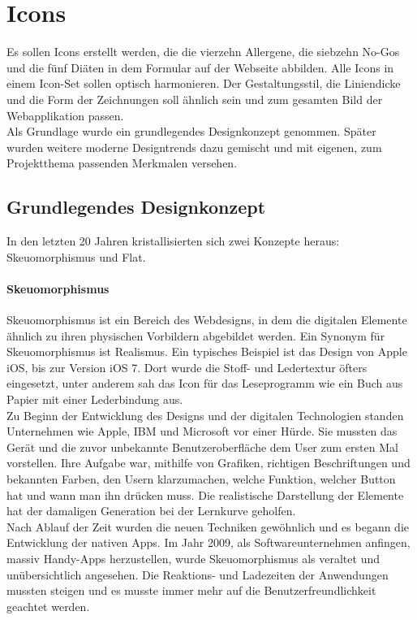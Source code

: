 \section{Icons}

Es sollen Icons erstellt werden, die die vierzehn Allergene, die siebzehn No-Gos und die fünf Diäten in dem Formular auf der Webseite abbilden. Alle Icons in einem Icon-Set sollen optisch harmonieren. Der Gestaltungsstil, die Liniendicke und die Form der Zeichnungen soll ähnlich sein und zum gesamten Bild der Webapplikation passen. \\

Als Grundlage wurde ein grundlegendes Designkonzept genommen. Später wurden weitere moderne Designtrends dazu gemischt und mit eigenen, zum Projektthema passenden Merkmalen versehen. 


\subsection{Grundlegendes Designkonzept} 
In den letzten 20 Jahren kristallisierten sich zwei Konzepte heraus: Skeuomorphismus und Flat.\cite{SkeuomorphismusvsFlat}

\paragraph{Skeuomorphismus} 
Skeuomorphismus ist ein Bereich des Webdesigns, in dem die digitalen Elemente ähnlich zu ihren physischen Vorbildern abgebildet werden. Ein Synonym für Skeuomorphismus ist Realismus. Ein typisches Beispiel ist das Design von Apple iOS, bis zur Version iOS 7. Dort wurde die Stoff- und Ledertextur öfters eingesetzt, unter anderem sah das Icon für das Leseprogramm wie ein Buch aus Papier mit einer Lederbindung aus. \\

Zu Beginn der Entwicklung des Designs und der digitalen Technologien standen Unternehmen wie Apple, IBM und Microsoft vor einer Hürde. Sie mussten das Gerät und die zuvor unbekannte Benutzeroberfläche dem User zum ersten Mal vorstellen. Ihre Aufgabe war, mithilfe von Grafiken, richtigen Beschriftungen und bekannten Farben, den Usern klarzumachen, welche Funktion, welcher Button hat und wann man ihn drücken muss. Die realistische Darstellung der Elemente hat der damaligen Generation bei der Lernkurve geholfen.\\

Nach Ablauf der Zeit wurden die neuen Techniken gewöhnlich und es 
begann die Entwicklung der nativen Apps. Im Jahr 2009, als Softwareunternehmen anfingen, massiv Handy-Apps herzustellen, wurde Skeuomorphismus als veraltet und unübersichtlich angesehen. Die Reaktions- und Ladezeiten der Anwendungen mussten steigen und es musste immer mehr auf die Benutzerfreundlichkeit geachtet werden.\\ 

